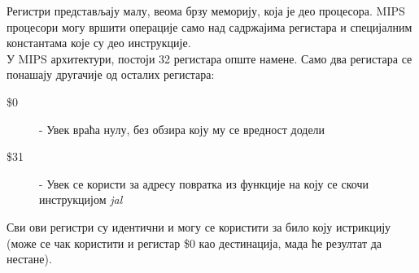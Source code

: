 \documentclass[12pt,oneside]{memoir}
\begin{document}
\indent Регистри представљају малу, веома брзу меморију, која је део процесора. MIPS процесори могу вршити операције само над садржајима регистара и специјалним константама које су део инструкције. \\
\indent У MIPS архитектури, постоји 32 регистара опште намене. Само два регистара се понашају другачије од осталих регистара:

\begin{description}
  \item[\$0] - Увек враћа нулу, без обзира коју му се вредност додели
  \item [\$31] - Увек се користи за адресу повратка из функције на коју се скочи инструкцијом \textit{jal}
\end{description}
Сви ови регистри су идентични и могу се користити за било коју истрикцију (може се чак користити и регистар \$0 као дестинација, мада ће резултат да нестане). 
\end{document}
